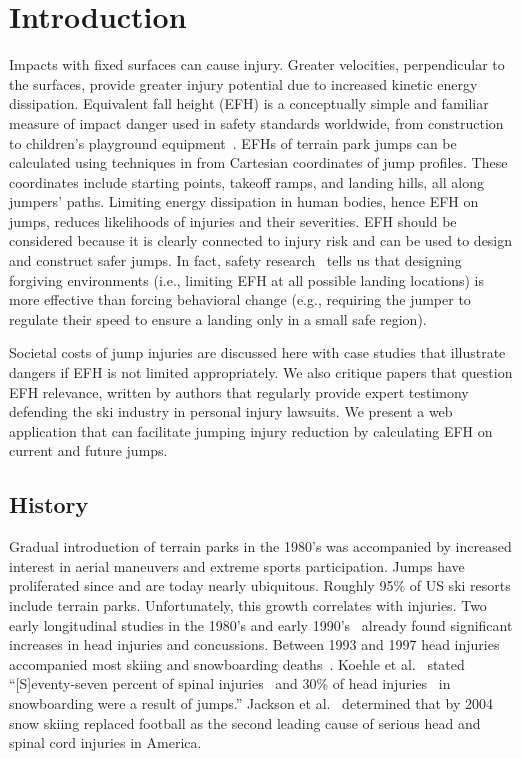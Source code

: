 \documentclass{article}
\begin{document}
\section{Introduction}
\label{intro}
%
Impacts with fixed surfaces can cause injury. Greater velocities, perpendicular
to the surfaces, provide greater injury potential due to increased kinetic
energy dissipation. Equivalent fall height (EFH) is a conceptually simple and
familiar measure of impact danger used in safety standards worldwide, from
construction~\cite{OSHA2021} to children's playground
equipment~\cite{Chalmers1996}. EFHs of terrain park jumps can be calculated
using techniques in \cite{Levy2015} from Cartesian coordinates of jump
profiles. These coordinates include starting points, takeoff ramps, and
landing hills, all along jumpers' paths. Limiting energy dissipation in human
bodies, hence EFH on jumps, reduces likelihoods of injuries and their
severities. EFH should be
considered because it is clearly connected to injury risk and can be used to
design and construct safer jumps. In fact, safety research~\cite{Smith2020}
tells us that designing forgiving environments (i.e., limiting EFH at all
possible landing locations) is more effective than forcing behavioral change
(e.g., requiring the jumper to regulate their speed to ensure a landing only in
a small safe region).

Societal costs of jump injuries are discussed here with case studies that
illustrate dangers if EFH is not limited appropriately. We also critique papers that question EFH relevance, written by authors that regularly provide
expert testimony defending the ski industry in personal injury lawsuits. We present a
web application that can facilitate jumping injury reduction by
calculating EFH on current and future jumps.

\subsection{History}
\label{sec:hist}
%
Gradual introduction of terrain parks in the 1980's was
accompanied by increased interest in aerial maneuvers and extreme sports
participation. Jumps have proliferated since and are today nearly ubiquitous.
Roughly 95\% of US ski resorts include terrain parks. Unfortunately, this
growth correlates with injuries. Two early longitudinal studies in the 1980's
and early 1990's~\cite{Deibert1998,Furrer1995} already found significant
increases in head injuries and concussions. Between 1993 and 1997 head injuries
accompanied most skiing and snowboarding deaths~\cite{CPSC1999}. Koehle et
al.~\cite{Koehle2002} stated ``[S]eventy-seven percent of spinal
injuries~\cite{Tarazi1999} and 30\% of head injuries~\cite{Fukuda2001} in
snowboarding were a result of jumps.'' Jackson et al.~\cite{Jackson2004}
determined that by 2004 snow skiing replaced football as the second leading
cause of serious head and spinal cord injuries in America.
\end{document}
